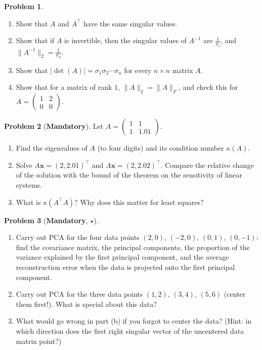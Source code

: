 \documentclass[11pt]{article}
\theoremstyle{definition}
\newtheorem{problem}{Problem}[section]
\newcommand{\mandatory}{\textcolor{red!70!black}{\textbf{Mandatory}}}
\newcommand{\norm}[1]{\lVert #1 \rVert}
\begin{document}
\begin{problem}\label{pr:svd-props}
    \begin{enumerate}[label=(\alph*)]
        \item Show that $A$ and $A^\top$ have the same singular values.
        \item Show that if $A$ is invertible, then the singular values of $A^{-1}$ are $\frac{1}{\sigma_i}$, and $\norm{A^{-1}}_2 = \frac{1}{\sigma_n}$.
        \item Show that $|\det(A)| = \sigma_1 \sigma_2 \cdots \sigma_n$ for every $n \times n$ matrix $A$.
        \item Show that for a matrix of rank $1$, $\norm{A}_2 = \norm{A}_F$, and check this for $A = \begin{pmatrix} 1 & 2 \\ 0 & 0 \end{pmatrix}$.
    \end{enumerate}
\end{problem}

\begin{problem}[\mandatory]\label{pr:condition}
    Let $A = \begin{pmatrix} 1 & 1 \\ 1 & 1.01 \end{pmatrix}$.
    \begin{enumerate}[label=(\alph*)]
        \item Find the eigenvalues of $A$ (to four digits) and its condition number $\kappa(A)$.
        \item Solve $A\mathbf{x} = (2, 2.01)^\top$ and $A\mathbf{x} = (2, 2.02)^\top$. Compare the relative change of the solution with the bound of the theorem on the sensitivity of linear systems.
        \item What is $\kappa(A^\top A)$? Why does this matter for least squares?
    \end{enumerate}
\end{problem}

\begin{problem}[\mandatory, $\star$]\label{pr:pca}
    \begin{enumerate}[label=(\alph*)]
        \item Carry out PCA for the four data points $(2, 0)$, $(-2, 0)$, $(0, 1)$, $(0, -1)$: find the covariance matrix, the principal components, the proportion of the variance explained by the first principal component, and the average reconstruction error when the data is projected onto the first principal component.
        \item Carry out PCA for the three data points $(1, 2)$, $(3, 4)$, $(5, 6)$ (center them first!). What is special about this data?
        \item What would go wrong in part (b) if you forgot to center the data? (Hint: in which direction does the first right singular vector of the uncentered data matrix point?)
    \end{enumerate}
\end{problem}
\end{document}

